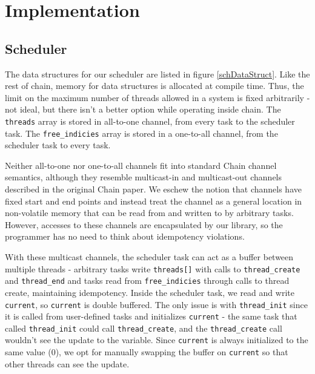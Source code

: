 \documentclass[11pt]{sensys-proc}
\newcommand{\chain}{Chain\xspace}
\begin{document}
\section{Implementation}
\subsection{Scheduler}

The data structures for our scheduler are listed in figure \ref{schDataStruct}.
Like the rest of chain, memory for data structures is allocated at compile
time. Thus, the limit on the maximum number of threads allowed in a system is
fixed arbitrarily - not ideal, but there isn't a better option while operating
inside chain. The \texttt{threads} array is stored in all-to-one channel, from
every task to the scheduler task. The \texttt{free\_indicies} array is stored
in a one-to-all channel, from the scheduler task to every task.


Neither all-to-one nor one-to-all channels fit into standard \chain channel
semantics, although they resemble multicast-in and multicast-out channels
described in the original \chain paper. We eschew the notion that channels
have fixed start and end points and instead treat the channel as a general
location in non-volatile memory that can be read from and written to by
arbitrary tasks. However, accesses to these channels are encapsulated by our
library, so the programmer has no need to think about idempotency violations.


With these multicast channels, the scheduler task can act as a buffer between
multiple threads - arbitrary tasks write \texttt{threads[]} with calls to
\texttt{thread\_create} and \texttt{thread\_end} and tasks read from
\texttt{free\_indicies} through calls to thread create, maintaining
idempotency. Inside the scheduler task, we read and write \texttt{current},
so \texttt{current} is double buffered. The only issue is with
\texttt{thread\_init} since it is called from user-defined tasks and
initializes \texttt{current} - the same task that called \texttt{thread\_init}
could call \texttt{thread\_create}, and the \texttt{thread\_create} call
wouldn't see the update to the variable. Since \texttt{current} is always
initialized to the same value (0), we opt for manually swapping the buffer on
\texttt{current} so that other threads can see the update.
\end{document}
